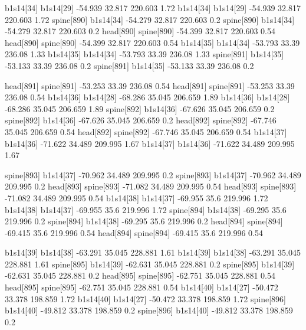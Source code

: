 b1s14[34]    b1s14[29]    -54.939    32.817    220.603    1.72
b1s14[34]    b1s14[29]    -54.939    32.817    220.603    1.72
spine[890]    b1s14[34]    -54.279    32.817    220.603    0.2
spine[890]    b1s14[34]    -54.279    32.817    220.603    0.2
head[890]    spine[890]    -54.399    32.817    220.603    0.54
head[890]    spine[890]    -54.399    32.817    220.603    0.54
b1s14[35]    b1s14[34]    -53.793    33.39    236.08    1.33
b1s14[35]    b1s14[34]    -53.793    33.39    236.08    1.33
spine[891]    b1s14[35]    -53.133    33.39    236.08    0.2
spine[891]    b1s14[35]    -53.133    33.39    236.08    0.2


head[891]    spine[891]    -53.253    33.39    236.08    0.54
head[891]    spine[891]    -53.253    33.39    236.08    0.54
b1s14[36]    b1s14[28]    -68.286    35.045    206.659    1.89
b1s14[36]    b1s14[28]    -68.286    35.045    206.659    1.89
spine[892]    b1s14[36]    -67.626    35.045    206.659    0.2
spine[892]    b1s14[36]    -67.626    35.045    206.659    0.2
head[892]    spine[892]    -67.746    35.045    206.659    0.54
head[892]    spine[892]    -67.746    35.045    206.659    0.54
b1s14[37]    b1s14[36]    -71.622    34.489    209.995    1.67
b1s14[37]    b1s14[36]    -71.622    34.489    209.995    1.67


spine[893]    b1s14[37]    -70.962    34.489    209.995    0.2
spine[893]    b1s14[37]    -70.962    34.489    209.995    0.2
head[893]    spine[893]    -71.082    34.489    209.995    0.54
head[893]    spine[893]    -71.082    34.489    209.995    0.54
b1s14[38]    b1s14[37]    -69.955    35.6    219.996    1.72
b1s14[38]    b1s14[37]    -69.955    35.6    219.996    1.72
spine[894]    b1s14[38]    -69.295    35.6    219.996    0.2
spine[894]    b1s14[38]    -69.295    35.6    219.996    0.2
head[894]    spine[894]    -69.415    35.6    219.996    0.54
head[894]    spine[894]    -69.415    35.6    219.996    0.54


b1s14[39]    b1s14[38]    -63.291    35.045    228.881    1.61
b1s14[39]    b1s14[38]    -63.291    35.045    228.881    1.61
spine[895]    b1s14[39]    -62.631    35.045    228.881    0.2
spine[895]    b1s14[39]    -62.631    35.045    228.881    0.2
head[895]    spine[895]    -62.751    35.045    228.881    0.54
head[895]    spine[895]    -62.751    35.045    228.881    0.54
b1s14[40]    b1s14[27]    -50.472    33.378    198.859    1.72
b1s14[40]    b1s14[27]    -50.472    33.378    198.859    1.72
spine[896]    b1s14[40]    -49.812    33.378    198.859    0.2
spine[896]    b1s14[40]    -49.812    33.378    198.859    0.2


